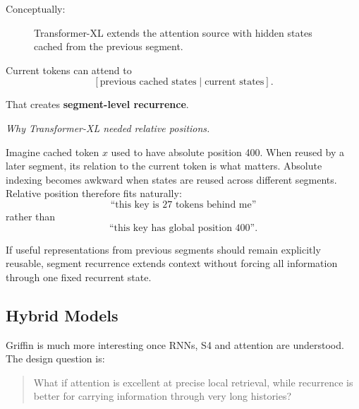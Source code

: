 Conceptually:

\begin{figure}[htbp]
\centering
{}
\caption{Transformer-XL extends the attention source with hidden states cached from the previous segment.}
\label{fig:modern-transformer-xl}
\end{figure}

Current tokens can attend to
\[
[\text{previous cached states}\mid\text{current states}].
\]

That creates \textbf{segment-level recurrence}.

\textit{Why Transformer-XL needed relative positions.}

Imagine cached token $x$ used to have absolute position 400.
When reused by a later segment, its relation to the current token is what matters.
Absolute indexing becomes awkward when states are reused across different segments.
Relative position therefore fits naturally:
\[
\text{``this key is 27 tokens behind me''}
\]
rather than
\[
\text{``this key has global position 400''}.
\]

\begin{calloutbias}
If useful representations from previous segments should remain explicitly reusable, segment recurrence extends context without forcing all information through one fixed recurrent state.
\end{calloutbias}

\subsection{Hybrid Models}
\label{subsec:modern-griffin}
Griffin is much more interesting once RNNs, S4 and attention are understood.
The design question is:

\begin{quote}
What if attention is excellent at precise local retrieval, while recurrence is better for carrying information through very long histories?
\end{quote}

